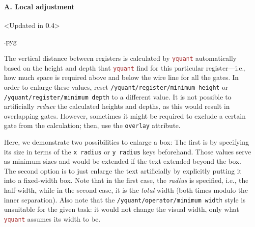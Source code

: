 \documentclass{scrartcl}
\makeatletter
\newenvironment{codeexample}{%
   \VerbatimEnvironment%
   \let\FVB@VerbatimOut\minted@FVB@VerbatimOut
   \let\FVE@VerbatimOut\minted@FVE@VerbatimOut
   \minted@configlang{tex}%
   \minted@fvset
   \begin{VerbatimOut}[codes={\catcode`\^^I=12},firstline,lastline]{\minted@jobname.pyg}%
}{
   \end{VerbatimOut}%
   \minted@langlinenoson%
   \savebox\codeexamplebox{ \minted@jobname.pyg}%
   \ifdim\wd\codeexamplebox>\dimexpr.5\linewidth-3mm\relax%
      \wd\codeexamplebox=.5\linewidth%
   \else%
      \wd\codeexamplebox=\dimexpr\wd\codeexamplebox+3mm\relax%
   \fi%
   \noindent\begin{minipage}{\wd\codeexamplebox}%
      \centering%
      \usebox\codeexamplebox%
   \end{minipage}%
   \begin{minipage}{\dimexpr\linewidth-\wd\codeexamplebox\relax}%
      \expandafter\minted@pygmentize\expandafter{\minted@lang}%
   \end{minipage}%
   \minted@langlinenosoff%
   \par%
}
\newenvironment{codeexample*}{%
   \VerbatimEnvironment%
   \let\FVB@VerbatimOut\minted@FVB@VerbatimOut
   \let\FVE@VerbatimOut\minted@FVE@VerbatimOut
   \minted@configlang{tex}%
   \minted@fvset
   \begin{VerbatimOut}[codes={\catcode`\^^I=12},firstline,lastline]{\minted@jobname.pyg}%
}{
   \end{VerbatimOut}%
   \minted@langlinenoson%
   \begin{adjustbox}{center}
       \minted@jobname.pyg %
   \end{adjustbox}\nopagebreak
   \expandafter\minted@pygmentize\expandafter{\minted@lang}%
   \minted@langlinenosoff%
   \par%
}
\def\pkg#1{\textcolor{brown}{\texttt{#1}}}
\def\ttlink{\link\texttt}
\def\Yquant{\pkg{yquant}}
\makeatother
\begin{document}
            \paragraph{A. Local adjustment}\leavevmode
               \begin{example}<Updated in 0.4>
                  \begin{codeexample}
                  \end{codeexample}
                  The vertical distance between registers is calculated by \Yquant{} automatically based on the height and depth that \Yquant{} find for this particular register---i.e., how much space is required above and below the wire line for all the gates.
                  In order to enlarge these values, reset \ttlink{/yquant/register/minimum height} or \ttlink{/yquant/register/minimum depth} to a different value.
                  It is not possible to artificially \emph{reduce} the calculated heights and depths, as this would result in overlapping gates.
                  However, sometimes it might be required to exclude a certain gate from the calculation; then, use the \ttlink{overlay} attribute.
               \end{example}

               \begin{example}
                  \begin{codeexample*}
                  \end{codeexample*}
                  Here, we demonstrate two possibilities to enlarge a box: The first is by specifying its size in terms of the \texttt{x radius} or \texttt{y radius} keys beforehand.
                  Those values serve as minimum sizes and would be extended if the text extended beyond the box.
                  The second option is to just enlarge the text artificially by explicitly putting it into a fixed\hyp width box.
                  Note that in the first case, the \emph{radius} is specified, i.e., the half\hyp width, while in the second case, it is the \emph{total} width (both times modulo the inner separation).
                  Also note that the \ttlink{/yquant/operator/minimum width} style is unsuitable for the given task: it would not change the visual width, only what \Yquant{} assumes its width to be.
               \end{example}
\end{document}
